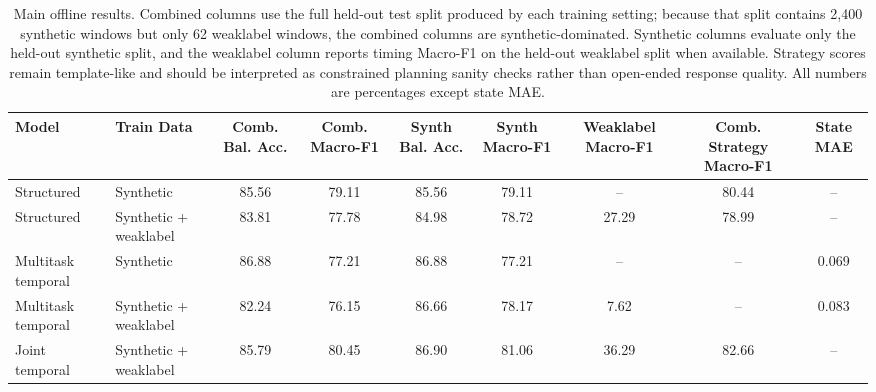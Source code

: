 \begin{table}[t]
\centering
\caption{Main offline results. Combined columns use the full held-out test split produced by each training setting; because that split contains 2{,}400 synthetic windows but only 62 weaklabel windows, the combined columns are synthetic-dominated. Synthetic columns evaluate only the held-out synthetic split, and the weaklabel column reports timing Macro-F1 on the held-out weaklabel split when available. Strategy scores remain template-like and should be interpreted as constrained planning sanity checks rather than open-ended response quality. All numbers are percentages except state MAE.}
\label{tab:main-results}
\small
\begin{tabular}{llccccccc}
\toprule
Model & Train Data & Comb. Bal. Acc. & Comb. Macro-F1 & Synth Bal. Acc. & Synth Macro-F1 & Weaklabel Macro-F1 & Comb. Strategy Macro-F1 & State MAE \\
\midrule
Structured & Synthetic & 85.56 & 79.11 & 85.56 & 79.11 & -- & 80.44 & -- \\
Structured & Synthetic + weaklabel & 83.81 & 77.78 & 84.98 & 78.72 & 27.29 & 78.99 & -- \\
Multitask temporal & Synthetic & 86.88 & 77.21 & 86.88 & 77.21 & -- & -- & 0.069 \\
Multitask temporal & Synthetic + weaklabel & 82.24 & 76.15 & 86.66 & 78.17 & 7.62 & -- & 0.083 \\
Joint temporal & Synthetic + weaklabel & 85.79 & 80.45 & 86.90 & 81.06 & 36.29 & 82.66 & -- \\
\bottomrule
\end{tabular}
\end{table}
